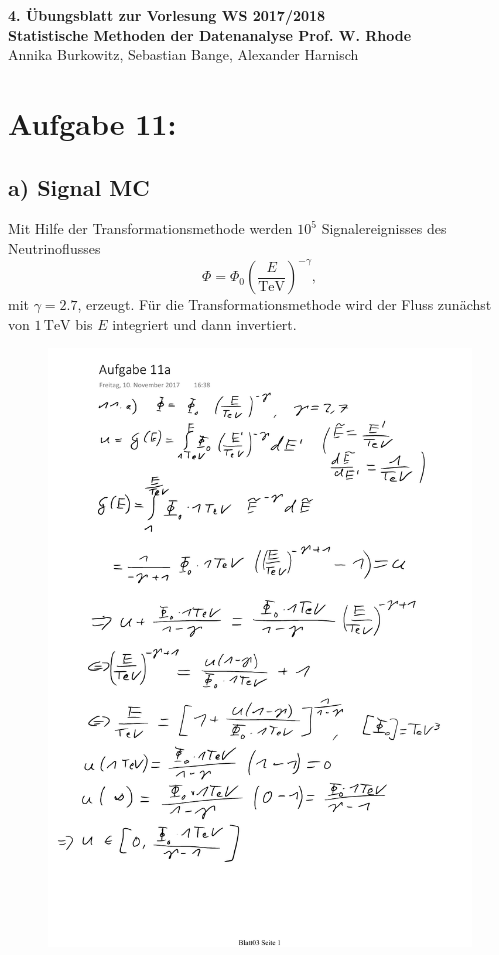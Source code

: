 \documentclass[a4paper, 11pt]{article}
\begin{document}
\noindent
\large{\textbf{4. Übungsblatt zur Vorlesung \hfill WS 2017/2018 \\
Statistische Methoden der Datenanalyse \hfill Prof. W. Rhode}} \\
Annika Burkowitz, Sebastian Bange, Alexander Harnisch \\
\noindent\makebox[\linewidth]{\rule{\textwidth}{0.4pt}}

\section*{Aufgabe 11: }
\subsection*{a) Signal MC}
Mit Hilfe der Transformationsmethode werden $10^5$ Signalereignisses des
Neutrinoflusses
\begin{equation}
  \Phi = \Phi_0 \left(\frac{E}{\text{TeV}}\right)^{-\gamma},
\end{equation}
mit $\gamma = 2.7$, erzeugt. Für die Transformationsmethode wird der Fluss zunächst
von $1\,\text{TeV}$ bis $E$ integriert und dann invertiert.
\begin{figure}
  \centering
  \includegraphics[width=\textwidth]{../Rechnung.pdf}
\end{figure}
\end{document}

